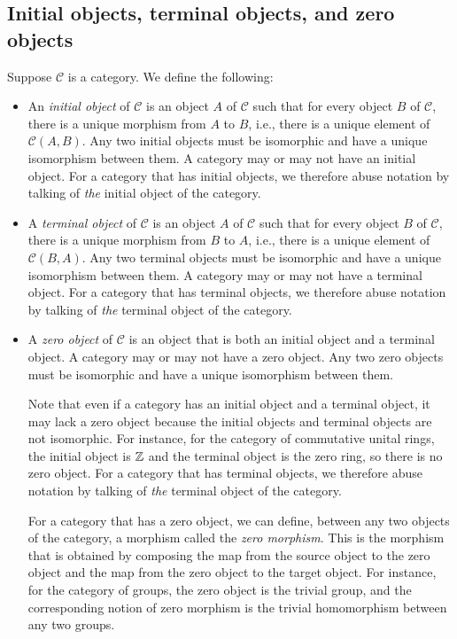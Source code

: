 \subsection{Initial objects, terminal objects, and zero objects}

Suppose $\mathcal{C}$ is a category. We define the following:

\begin{itemize}
\item An {\em initial object} of $\mathcal{C}$ is an object $A$ of
  $\mathcal{C}$ such that for every object $B$ of $\mathcal{C}$, there
  is a unique morphism from $A$ to $B$, i.e., there is a unique
  element of $\mathcal{C}(A,B)$. Any two initial objects must be
  isomorphic and have a unique isomorphism between them. A category
  may or may not have an initial object. For a category that has
  initial objects, we therefore abuse notation by talking of {\em the}
  initial object of the category.
\item A {\em terminal object} of $\mathcal{C}$ is an object $A$ of
  $\mathcal{C}$ such that for every object $B$ of $\mathcal{C}$, there
  is a unique morphism from $B$ to $A$, i.e., there is a unique
  element of $\mathcal{C}(B,A)$. Any two terminal objects must be
  isomorphic and have a unique isomorphism between them. A category
  may or may not have a terminal object. For a category that has
  terminal objects, we therefore abuse notation by talking of {\em
    the} terminal object of the category.
\item A {\em zero object} of $\mathcal{C}$ is an object that is both
  an initial object and a terminal object. A category may or may not
  have a zero object. Any two zero objects must be isomorphic and have
  a unique isomorphism between them.

  Note that even if a category has an initial
  object and a terminal object, it may lack a zero object because the
  initial objects and terminal objects are not isomorphic. For
  instance, for the category of commutative unital rings, the initial
  object is $\mathbb{Z}$ and the terminal object is the zero ring, so there is
  no zero object. For a category that has terminal objects, we
  therefore abuse notation by talking of {\em the} terminal object of
  the category.

  For a category that has a zero object, we can define, between any
  two objects of the category, a morphism called the {\em zero
    morphism}. This is the morphism that is obtained by composing the
  map from the source object to the zero object and the map from the
  zero object to the target object. For instance, for the category of
  groups, the zero object is the trivial group, and the corresponding
  notion of zero morphism is the trivial homomorphism between any two
  groups.
\end{itemize}

